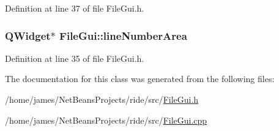 Definition at line 37 of file File\-Gui.\-h.

\hypertarget{class_file_gui_a4fa030b7bda34eeb961eac7324f28b88}{
\subsubsection[{line\-Number\-Area}]{\setlength{\rightskip}{0pt plus 5cm}Q\-Widget$\ast$ File\-Gui\-::line\-Number\-Area\hspace{0.3cm}{\ttfamily [private]}}}\label{class_file_gui_a4fa030b7bda34eeb961eac7324f28b88}


Definition at line 35 of file File\-Gui.\-h.



The documentation for this class was generated from the following files\-:\begin{DoxyCompactItemize}
\item 
/home/james/\-Net\-Beans\-Projects/ride/src/\hyperlink{_file_gui_8h}{File\-Gui.\-h}\item 
/home/james/\-Net\-Beans\-Projects/ride/src/\hyperlink{_file_gui_8cpp}{File\-Gui.\-cpp}\end{DoxyCompactItemize}
